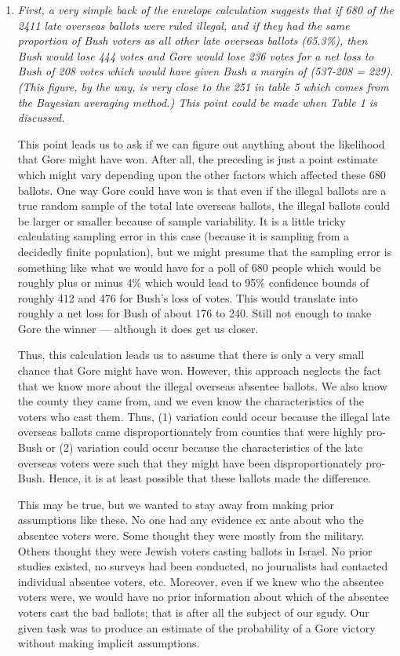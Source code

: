 \documentclass[11pt]{article}
\begin{document}
\begin{enumerate}
\item {\it First, a very simple back of the envelope calculation
    suggests that if 680 of the 2411 late overseas ballots were ruled
    illegal, and if they had the same proportion of Bush voters as all
    other late overseas ballots (65.3\%), then Bush would lose 444
    votes and Gore would lose 236 votes for a net loss to Bush of 208
    votes which would have given Bush a margin of (537-208 = 229).
    (This figure, by the way, is very close to the 251 in table 5
    which comes from the Bayesian averaging method.)  This point could
    be made when Table 1 is discussed.
    
    This point leads us to ask if we can figure out anything about the
    likelihood that Gore might have won.  After all, the preceding is
    just a point estimate which might vary depending upon the other
    factors which affected these 680 ballots.  One way Gore could have
    won is that even if the illegal ballots are a true random sample
    of the total late overseas ballots, the illegal ballots could be
    larger or smaller because of sample variability.  It is a little
    tricky calculating sampling error in this case (because it is
    sampling from a decidedly finite population), but we might presume
    that the sampling error is something like what we would have for a
    poll of 680 people which would be roughly plus or minus 4\% which
    would lead to 95\% confidence bounds of roughly 412 and 476 for
    Bush's loss of votes.  This would translate into roughly a net
    loss for Bush of about 176 to 240.  Still not enough to make Gore
    the winner --- although it does get us closer. 
    
    Thus, this calculation leads us to assume that there is only a
    very small chance that Gore might have won.  However, this
    approach neglects the fact that we know more about the illegal
    overseas absentee ballots.  We also know the county they came
    from, and we even know the characteristics of the voters who cast
    them.  Thus, (1) variation could occur because the illegal late
    overseas ballots came disproportionately from counties that were
    highly pro-Bush or (2) variation could occur because the
    characteristics of the late overseas voters were such that they
    might have been disproportionately pro-Bush.  Hence, it is at
    least possible that these ballots made the difference.}
   
  
  This may be true, but we wanted to stay away from making prior
  assumptions like these.  No one had any evidence ex ante about who
  the absentee voters were.  Some thought they were mostly from the
  military.  Others thought they were Jewish voters casting ballots in
  Israel.  No prior studies existed, no surveys had been conducted, no
  journalists had contacted individual absentee voters, etc.
  Moreover, even if we knew who the absentee voters were, we would
  have no prior information about which of the absentee voters cast
  the bad ballots; that is after all the subject of our sgudy.  Our
  given task was to produce an estimate of the probability of a Gore
  victory without making implicit assumptions.
  

\end{enumerate}
\end{document}
